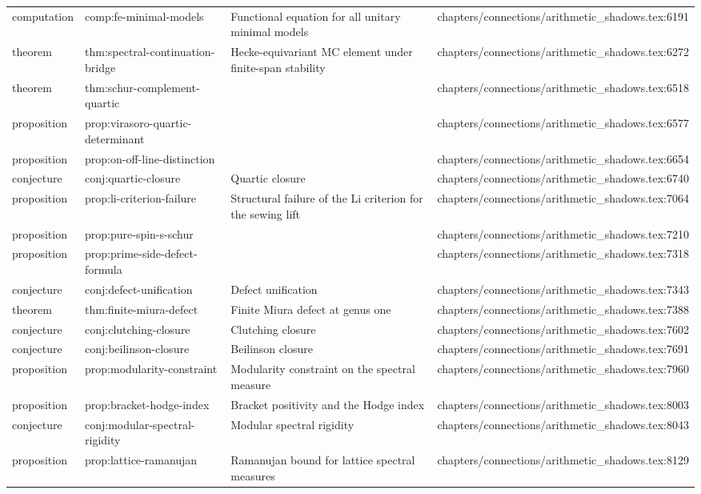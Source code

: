 \documentclass[11pt]{article}
\begin{document}
\begin{longtable}{L{0.10\textwidth}L{0.26\textwidth}L{0.42\textwidth}L{0.22\textwidth}}
computation & comp:fe-minimal-models & Functional equation for all unitary minimal models & chapters/connections/arithmetic\_shadows.tex:6191\\
theorem & thm:spectral-continuation-bridge & Hecke-equivariant MC element under finite-span stability & chapters/connections/arithmetic\_shadows.tex:6272\\
theorem & thm:schur-complement-quartic &  & chapters/connections/arithmetic\_shadows.tex:6518\\
proposition & prop:virasoro-quartic-determinant &  & chapters/connections/arithmetic\_shadows.tex:6577\\
proposition & prop:on-off-line-distinction &  & chapters/connections/arithmetic\_shadows.tex:6654\\
conjecture & conj:quartic-closure & Quartic closure & chapters/connections/arithmetic\_shadows.tex:6740\\
proposition & prop:li-criterion-failure & Structural failure of the Li criterion for the sewing lift & chapters/connections/arithmetic\_shadows.tex:7064\\
proposition & prop:pure-spin-s-schur &  & chapters/connections/arithmetic\_shadows.tex:7210\\
proposition & prop:prime-side-defect-formula &  & chapters/connections/arithmetic\_shadows.tex:7318\\
conjecture & conj:defect-unification & Defect unification & chapters/connections/arithmetic\_shadows.tex:7343\\
theorem & thm:finite-miura-defect & Finite Miura defect at genus one & chapters/connections/arithmetic\_shadows.tex:7388\\
conjecture & conj:clutching-closure & Clutching closure & chapters/connections/arithmetic\_shadows.tex:7602\\
conjecture & conj:beilinson-closure & Beilinson closure & chapters/connections/arithmetic\_shadows.tex:7691\\
proposition & prop:modularity-constraint & Modularity constraint on the spectral measure & chapters/connections/arithmetic\_shadows.tex:7960\\
proposition & prop:bracket-hodge-index & Bracket positivity and the Hodge index & chapters/connections/arithmetic\_shadows.tex:8003\\
conjecture & conj:modular-spectral-rigidity & Modular spectral rigidity & chapters/connections/arithmetic\_shadows.tex:8043\\
proposition & prop:lattice-ramanujan & Ramanujan bound for lattice spectral measures & chapters/connections/arithmetic\_shadows.tex:8129\\

\end{longtable}
\end{document}
